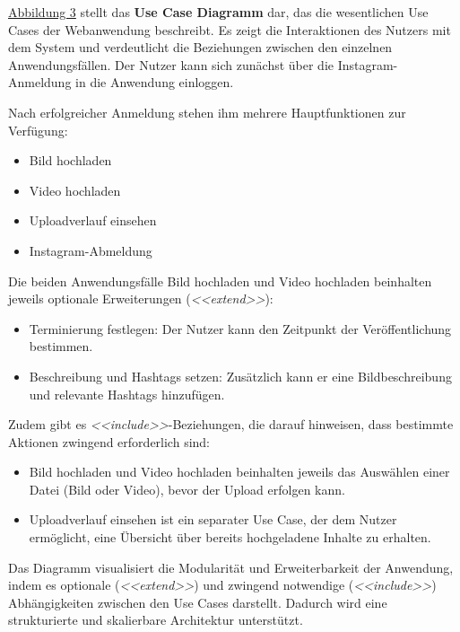 \hyperref[fig:fig-3]{Abbildung 3} stellt das \textbf{Use Case Diagramm} dar, das die wesentlichen Use Cases der Webanwendung beschreibt. Es zeigt die Interaktionen 
des Nutzers mit dem System und verdeutlicht die Beziehungen zwischen den einzelnen Anwendungsfällen. Der Nutzer kann sich zunächst über die Instagram-Anmeldung in 
die Anwendung einloggen.

Nach erfolgreicher Anmeldung stehen ihm mehrere Hauptfunktionen zur Verfügung:
\begin{itemize}
    \item Bild hochladen
    \item Video hochladen
    \item Uploadverlauf einsehen
    \item Instagram-Abmeldung
\end{itemize}

Die beiden Anwendungsfälle Bild hochladen und Video hochladen beinhalten jeweils optionale Erweiterungen (\textit{<<extend>>}):
\begin{itemize}
    \item Terminierung festlegen: Der Nutzer kann den Zeitpunkt der Veröffentlichung bestimmen.
    \item Beschreibung und Hashtags setzen: Zusätzlich kann er eine Bildbeschreibung und relevante Hashtags hinzufügen.
\end{itemize}

Zudem gibt es \textit{<<include>>}-Beziehungen, die darauf hinweisen, dass bestimmte Aktionen zwingend erforderlich sind:
\begin{itemize}
    \item Bild hochladen und Video hochladen beinhalten jeweils das Auswählen einer Datei (Bild oder Video), bevor der Upload erfolgen kann.
    \item Uploadverlauf einsehen ist ein separater Use Case, der dem Nutzer ermöglicht, eine Übersicht über bereits hochgeladene Inhalte zu erhalten.
\end{itemize}

Das Diagramm visualisiert die Modularität und Erweiterbarkeit der Anwendung, indem es optionale (\textit{<<extend>>}) und zwingend notwendige (\textit{<<include>>}) 
Abhängigkeiten zwischen den Use Cases darstellt. Dadurch wird eine strukturierte und skalierbare Architektur unterstützt.

